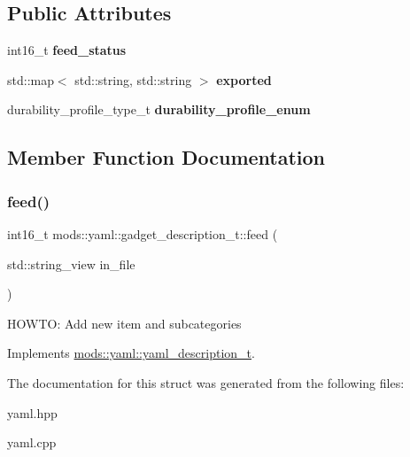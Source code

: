 \subsection*{Public Attributes}
\begin{DoxyCompactItemize}
\item 
\mbox{\label{structmods_1_1yaml_1_1gadget__description__t_a24283454c6202e13d72064c0830c631c}} 
int16\+\_\+t {\bfseries feed\+\_\+status}
\item 
\mbox{\label{structmods_1_1yaml_1_1gadget__description__t_a5100f73513e0b1f86ad0e14b9d13c67b}} 
std\+::map$<$ std\+::string, std\+::string $>$ {\bfseries exported}
\item 
\mbox{\label{structmods_1_1yaml_1_1gadget__description__t_ae30976e3f8dccdeec9e918d3e2da53b1}} 
durability\+\_\+profile\+\_\+type\+\_\+t {\bfseries durability\+\_\+profile\+\_\+enum}
\end{DoxyCompactItemize}


\subsection{Member Function Documentation}
\mbox{\label{structmods_1_1yaml_1_1gadget__description__t_aeeed72fdc9b348de1fb71fbc1fb176a6}} 
\subsubsection{\texorpdfstring{feed()}{feed()}}
{\footnotesize\ttfamily int16\+\_\+t mods\+::yaml\+::gadget\+\_\+description\+\_\+t\+::feed (\begin{DoxyParamCaption}\item[{std\+::string\+\_\+view}]{in\+\_\+file }\end{DoxyParamCaption})\hspace{0.3cm}{\ttfamily [virtual]}}

H\+O\+W\+TO\+: Add new item and subcategories 

Implements \hyperlink{structmods_1_1yaml_1_1yaml__description__t}{mods\+::yaml\+::yaml\+\_\+description\+\_\+t}.



The documentation for this struct was generated from the following files\+:\begin{DoxyCompactItemize}
\item 
yaml.\+hpp\item 
yaml.\+cpp\end{DoxyCompactItemize}
